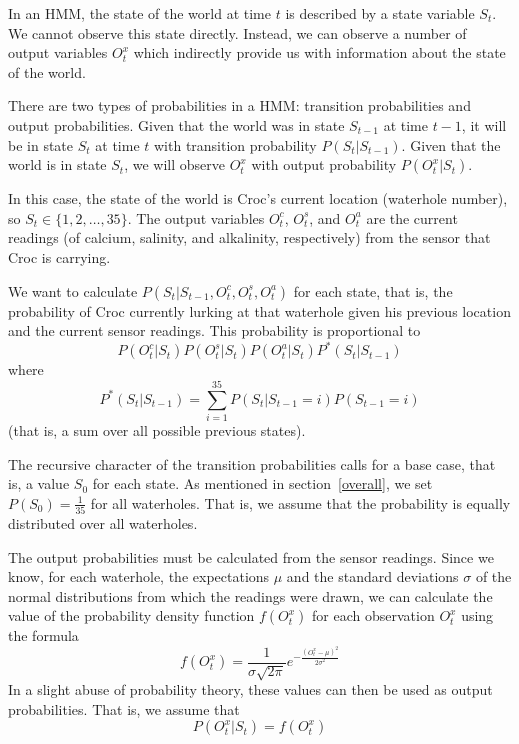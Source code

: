 \documentclass[a4paper]{article}
\begin{document}
In an HMM, the state of the world at time $t$ is
described by a state variable $S_t$. We cannot observe this state
directly. Instead, we can observe a number of output variables $O^x_t$ which indirectly provide us with information about the state
of the world.

There are two types of probabilities in a HMM: transition probabilities and
output probabilities. Given that the world was in state $S_{t-1}$ at time $t-1$, it
will be in state $S_t$ at time $t$ with transition probability
$P(S_t|S_{t-1})$. Given that the world is in state $S_t$, we will observe
$O^x_t$ with output probability $P(O^x_t|S_t)$.

In this case, the state of the world is Croc's current location (waterhole
number), so $S_t \in \{1, 2, \dots, 35\}$. The output variables $O^c_t$, $O^s_t$, and $O^a_t$ are the current
readings (of calcium, salinity, and alkalinity, respectively) from the sensor
that Croc is carrying.

We want to calculate $P(S_t|S_{t-1}, O^c_t, O^s_t, O^a_t)$ for each state,
that is, the probability of Croc currently lurking at that waterhole
given his previous location and the current sensor readings. This probability
is proportional to
\begin{equation*}
P(O^c_t|S_t)P(O^s_t|S_t)P(O^a_t|S_t)P^*(S_t|S_{t-1})
\end{equation*}
where
\begin{equation*}
P^*(S_t|S_{t-1}) = \sum\limits_{i=1}^{35} P(S_t|S_{t-1}=i)P(S_{t-1}=i)  
\end{equation*}
(that is, a sum over all possible previous states). %

The recursive character of
the transition probabilities calls for a base case, that is, a value $S_0$ for
each state. As mentioned in section~\ref{overall}, we set $P(S_0) =
\frac{1}{35}$ for all waterholes. That is, we assume
that the probability is equally distributed over all waterholes.

The output probabilities must be calculated from the sensor
readings. Since we know, for each waterhole, the expectations $\mu$ and the
standard deviations $\sigma$ of the normal distributions from which the readings were
drawn, we can calculate the value of the probability density function
$f(O^x_t)$ for each observation $O^x_t$ using the formula
\begin{equation*}
  f(O^x_t) = \frac{1}{\sigma \sqrt{2 \pi}}e^{-\frac{(O^x_t-\mu)^2}{2\sigma ^2}}
\end{equation*}
In a slight abuse of probability theory, these values can then be used as
output probabilities. That is, we assume that
\begin{equation*}
  P(O^x_t|S_t) = f(O^x_t)
\end{equation*}
\end{document}
